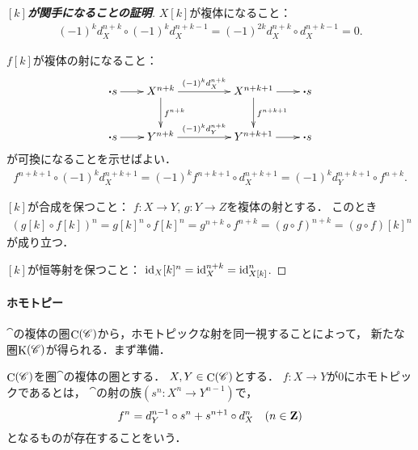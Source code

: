 \begin{proof}[\textbf{$[k]$が関手になることの証明}]
    $X[k]$が複体になること：
    \begin{align*}
        (-1)^kd_X^{n+k}\circ (-1)^kd_X^{n+k-1}
        =(-1)^{2k}d_X^{n+k}\circ d_X^{n+k-1}=0.
    \end{align*} 

    $f[k]$が複体の射になること：
    \begin{equation*}
        \vcenter{\xymatrix
        @C=20pt@R=26pt
        {
        \boldsymbol{\cdot}s \ar[r]
        & 
        X^{n+k}
        \ar[rr]^-{(-1)^kd_X^{n+k}}
        \ar[d]^-{f^{n+k}}
        &&
        X^{n+k+1}
        \ar[r]
        \ar[d]^-{f^{n+k+1}} 
        &\boldsymbol{\cdot}s
        \\
        \boldsymbol{\cdot}s \ar[r]
        & 
        Y^{n+k}
        \ar[rr]^-{(-1)^kd_Y^{n+k}}
        &&
        Y^{n+k+1}
        \ar[r]
        &\boldsymbol{\cdot}s
        }}
    \end{equation*}
    が可換になることを示せばよい．
    \begin{align*}
        f^{n+k+1}\circ (-1)^{k}d_X^{n+k+1}
        =(-1)^{k}f^{n+k+1}\circ d_X^{n+k+1}
        =(-1)^{k}d_Y^{n+k+1}\circ f^{n+k}. 
    \end{align*}

    $[k]$が合成を保つこと：
    $f\colon X\to Y$, $g\colon Y\to Z$を複体の射とする．
    このとき
    \begin{align*}
        (g[k]\circ f[k])^n
        =g[k]^n\circ f[k]^n
        =g^{n+k}\circ f^{n+k}
        =(g\circ f)^{n+k}
        =(g\circ f)[k]^n        
    \end{align*}
    が成り立つ．

    $[k]$が恒等射を保つこと：
    $\mathop{\mathrm{id}}\nolimits_X[k]^n=\mathop{\mathrm{id}}\nolimits_X^{n+k}=\mathop{\mathrm{id}}\nolimits_{X[k]}^{n}$.
\end{proof}

\paragraph{ホモトピー}
$\cat$の複体の圏$\mathop{\mathrm{C}}\nolimits(\mathscr{C})$から，ホモトピックな射を同一視することによって，
新たな圏$\mathop{\mathrm{K}}\nolimits(\mathscr{C})$が得られる．まず準備．

$\mathop{\mathrm{C}}\nolimits(\mathscr{C})$を圏$\cat$の複体の圏とする．
$X,Y\in\mathop{\mathrm{C}}\nolimits(\mathscr{C})$とする．
$f\colon X\to Y$が0にホモトピックであるとは，
$\cat$の射の族$(s^n\colon X^n\to Y^{n-1})$で，
\begin{equation}
    f^n=d_Y^{n-1}\circ s^n+s^{n+1}\circ d_X^{n}\quad(n\in\mathbf{Z})
\end{equation}
となるものが存在することをいう．

